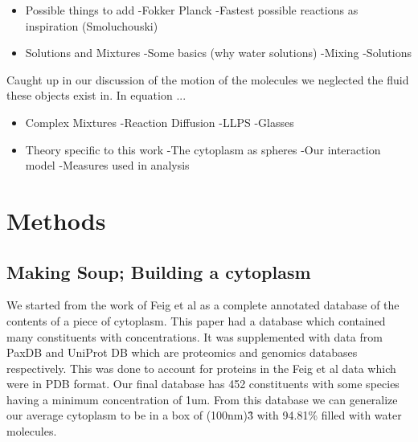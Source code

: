 \documentclass[draft, english]{volcanica-template}
\begin{document}
\begin{itemize}
\item Possible things to add \newline
-Fokker Planck \newline
-Fastest possible reactions as inspiration (Smoluchouski)


\item Solutions and Mixtures \newline
-Some basics (why water solutions)\newline
-Mixing\newline
-Solutions
\end{itemize}

Caught up in our discussion of the motion of the molecules we neglected the fluid these objects exist in. In equation ...

\begin{itemize}
\item Complex Mixtures \newline
-Reaction Diffusion \newline
-LLPS \newline
-Glasses


\item Theory specific to this work \newline
-The cytoplasm as spheres \newline
-Our interaction model \newline
-Measures used in analysis
\end{itemize}

\section{Methods}

\subsection{Making Soup; Building a cytoplasm}

We started from the work of Feig et al as a complete annotated database of the contents of a piece of cytoplasm. This paper had a database which contained many  constituents with concentrations. It was supplemented with data from PaxDB and UniProt DB which are proteomics and genomics databases respectively. This was done to account for proteins in the Feig et al data which were in PDB format. Our final database has 452 constituents with some species having a minimum concentration of 1um. From this database we can generalize our average cytoplasm to be in a box of (100nm)\^3 with 94.81\% filled with water molecules.
\end{document}

